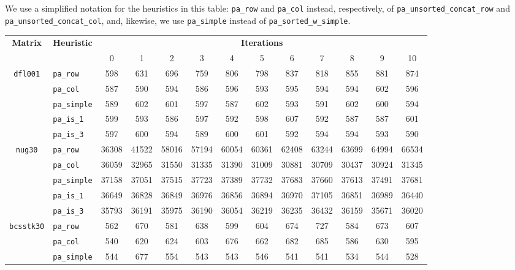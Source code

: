 We use a simplified notation for the heuristics in this table: \verb|pa_row| and \verb|pa_col| instead, respectively, of \verb|pa_unsorted_concat_row| and \verb|pa_unsorted_concat_col|, and, likewise, we use \verb|pa_simple| instead of \verb|pa_sorted_w_simple|.

\begin{table}
	\centering
	\renewcommand{\arraystretch}{1.2}
	\begin{tabular}{|c|l|c||c|c|c|c|c|c|c|c|c|c|}
		\hline
		\multirow{2}{*}{\textbf{Matrix}} &\multirow{2}{*}{\textbf{Heuristic}} & \multicolumn{11}{c|}{\textbf{Iterations}} \\ \cline{3-13} 
		&& 0 & 1 & 2 & 3 & 4 & 5 & 6 & 7 & 8 & 9 & 10 \\ \hline
		\multirow{5}{*}{\texttt{dfl001}}		&\verb|pa_row| & 598 & 631 & 696 & 759 & 806 & 798 & 837 & 818 & 855 & 881 & 874 \\ 
		&\verb|pa_col| &  587&  590 & 594 & 586 & 596 & 593 & 595 & 594 & 594 & 602 & 596 \\ 
		&\verb|pa_simple| & 589 & 602 & 601 & 597 & 587 & 602 & 593 & 591 & 602 & 600 & 594 \\
		&\verb|pa_is_1| & 599 & 593 & 586 & 597 & 592 & 598 & 607 & 592 & 587 & 587  & 601 \\
		&\verb|pa_is_3| & 597 & 600 & 594 & 589 & 600 & 601 & 592 & 594 & 594 & 593 & 590 \\
		\hline
		\multirow{5}{*}{\texttt{nug30}}		&\verb|pa_row| & 	36308 & 41522 & 58016 & 57194 & 60054 & 60361 & 62408 & 63244 & 63699 & 64994 & 66534 \\ 
		&\verb|pa_col| & 36059 & 32965&  31550 & 31335 & 31390 & 31009 & 30881 & 30709 & 30437 & 30924 & 31345 \\
		&\verb|pa_simple| & 37158 & 37051 & 37515 & 37723 & 37389 & 37732 & 37683 & 37660 & 37613 & 37491 & 37681 \\
		&\verb|pa_is_1| & 	36649 & 36828 & 36849 & 36976 & 36856 & 36894 & 36970 & 37105 & 36851 & 36989 & 36440 \\
		&\verb|pa_is_3| & 35793 & 36191 & 35975 & 36190 & 36054 & 36219 & 36235 & 36432 & 36159 & 35671 & 36020 \\ \hline
		\multirow{5}{*}{\texttt{bcsstk30}}		&\verb|pa_row| &  562 & 670 & 581&  638 &  599 &  604 &  674 &  727&   584&   673 &  607 \\ 
		&\verb|pa_col| & 540 &  620 & 624 & 603 & 676 & 662 & 682 & 685 & 586 & 630 & 595 \\ 
		&\verb|pa_simple| &544 & 677 & 554 & 543 & 543 & 546 & 541 & 541 & 534 & 544 & 528 \\

\end{tabular}
\end{table}
